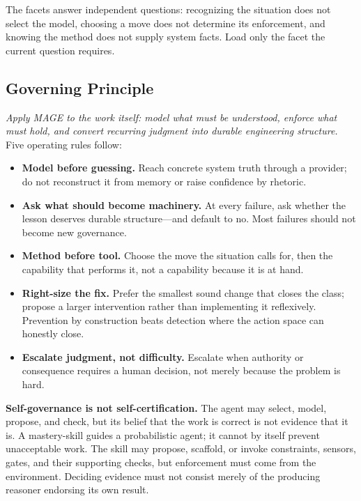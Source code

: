 


The facets answer independent questions: recognizing the situation does not select the model, choosing a move does not determine its enforcement, and knowing the method does not supply system facts. Load only the facet the current question requires.

\subsection{Governing Principle}\label{heading:governing-principle-1}

\emph{Apply MAGE to the work itself: model what must be understood, enforce what must hold, and convert recurring judgment into durable engineering structure.} Five operating rules follow:

\begin{itemize}
\tightlist
\item
  \textbf{Model before guessing.} Reach concrete system truth through a provider; do not reconstruct it from memory or raise confidence by rhetoric.
\item
  \textbf{Ask what should become machinery.} At every failure, ask whether the lesson deserves durable structure---and default to no. Most failures should not become new governance.
\item
  \textbf{Method before tool.} Choose the move the situation calls for, then the capability that performs it, not a capability because it is at hand.
\item
  \textbf{Right-size the fix.} Prefer the smallest sound change that closes the class; propose a larger intervention rather than implementing it reflexively. Prevention by construction beats detection where the action space can honestly close.
\item
  \textbf{Escalate judgment, not difficulty.} Escalate when authority or consequence requires a human decision, not merely because the problem is hard.
\end{itemize}

\textbf{Self-governance is not self-certification.} The agent may select, model, propose, and check, but its belief that the work is correct is not evidence that it is. A mastery-skill guides a probabilistic agent; it cannot by itself prevent unacceptable work. The skill may propose, scaffold, or invoke constraints, sensors, gates, and their supporting checks, but enforcement must come from the environment. Deciding evidence must not consist merely of the producing reasoner endorsing its own result.


